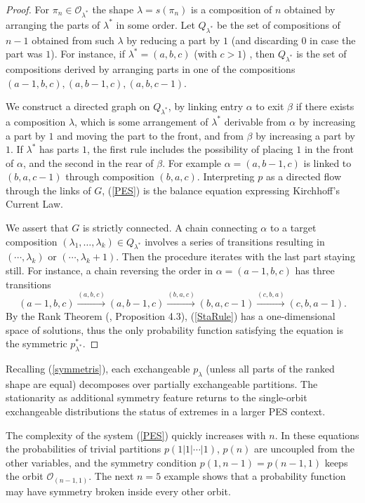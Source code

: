 \documentclass{article}
\begin{document}
\begin{proof}   For $\pi_n\in {\mathcal O}_{\lambda^*}$ the shape $\lambda=s(\pi_n)$ is a composition of $n$ obtained by arranging the parts of $\lambda^*$ in some order. 
Let $Q_{\lambda^*}$ be the set of compositions of $n-1$ obtained from such $\lambda$ by reducing a part by $1$ (and discarding $0$ in case the part was $1$).
For instance, if $\lambda^*=(a,b,c)$ (with $c>1$) , then $Q_{\lambda^*}$ is the set of compositions derived by arranging parts in one of the compositions  $(a-1,b,c), (a,b-1,c), (a,b,c-1)$.

We construct a directed graph on $Q_{\lambda^*}$, by linking entry $\alpha$ to exit $\beta$ if there exists a composition $\lambda$, which is some arrangement of $\lambda^*$ 
derivable from $\alpha$ by increasing a part by $1$ and moving the part to the front, and from $\beta$ by increasing a part by $1$. 
If $\lambda^*$ has parts $1$, the first rule includes the possibility of placing $1$ in the front  of $\alpha$, and the second in the rear of $\beta$.
For example $\alpha=(a,b-1,c)$ is linked to $(b,a,c-1)$ through 
composition $(b,a,c)$.
Interpreting $p$ as a directed flow through the links of $G$, (\ref{PES}) is the balance equation expressing  Kirchhoff's Current Law.

We assert that $G$ is strictly connected.  A chain connecting $\alpha$ to a target composition $(\lambda_1,\ldots,\lambda_k)\in Q_{\lambda^*}$ involves a series of transitions resulting in $(\cdots,\lambda_k)$ 
 or $(\cdots,\lambda_k+1)$. Then the procedure iterates with the last part staying still. For instance, a chain reversing the order in $\alpha=(a-1,b,c)$ has three transitions
$$(a-1,b,c) \stackrel{(a,b,c)}{\longrightarrow} (a,b-1,c)     \stackrel{(b,a,c)}{\longrightarrow} (b, a,c-1)  \stackrel{(c,b,a)}{\longrightarrow} (c, b,a-1).$$
 By the Rank Theorem (\cite{Biggs}, Proposition 4.3), (\ref{StaRule}) has a one-dimensional space of solutions, thus the only probability function satisfying the equation is the symmetric $p_{\lambda^*}^*$.
\end{proof}


Recalling (\ref{symmetris}),  each exchangeable $p_\lambda$ (unless all parts of the ranked shape are equal) decomposes over partially exchangeable partitions. The stationarity as additional 
symmetry feature returns to the single-orbit exchangeable distributions the status of extremes in a larger PES context.  
 



The complexity of the system (\ref{PES}) quickly increases with $n$.
In these equations  the probabilities of trivial partitions $p(1|1|\cdots|1)$, $p(n)$ are uncoupled from the other variables, 
and the  symmetry condition $p(1,n-1)=p(n-1,1)$ keeps the orbit ${\mathcal O}_{(n-1,1)}$.
The next $n=5$ example  shows that  a probability function may have symmetry broken inside every other orbit.
\end{document}
